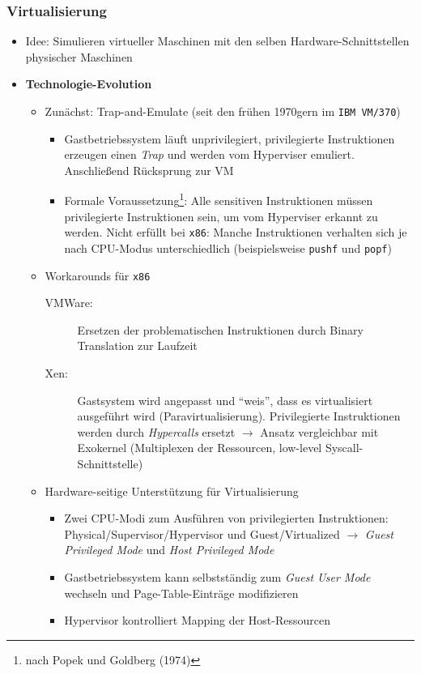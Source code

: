 \subsubsection{Virtualisierung}
\begin{itemize}
	\item Idee: Simulieren virtueller Maschinen mit den selben Hardware-Schnittstellen physischer Maschinen
	\item \textbf{Technologie-Evolution}
	\begin{itemize}
		\item Zunächst: Trap-and-Emulate (seit den frühen 1970gern im \texttt{IBM VM/370})
		\begin{itemize}
			\item Gastbetriebssystem läuft unprivilegiert, privilegierte Instruktionen erzeugen einen \textit{Trap} und werden vom Hyperviser emuliert. Anschließend Rücksprung zur VM
			\item Formale Voraussetzung\footnote{nach Popek und Goldberg (1974)}: Alle sensitiven Instruktionen müssen privilegierte Instruktionen sein, um vom Hyperviser erkannt zu werden. Nicht erfüllt bei \texttt{x86}: Manche Instruktionen verhalten sich je nach CPU-Modus unterschiedlich (beispielsweise \texttt{pushf} und \texttt{popf})
		\end{itemize}
		\item Workarounds für \texttt{x86}
		\begin{description}
			\item[VMWare:] Ersetzen der problematischen Instruktionen durch Binary Translation zur Laufzeit
			\item[Xen:] Gastsystem wird angepasst und "`weis"', dass es virtualisiert ausgeführt wird (Paravirtualisierung). Privilegierte Instruktionen werden durch \textit{Hypercalls} ersetzt \(\rightarrow\) Ansatz vergleichbar mit Exokernel (Multiplexen der Ressourcen, low-level Syscall-Schnittstelle)
		\end{description}
		\item Hardware-seitige Unterstützung für Virtualisierung
		\begin{itemize}
			\item Zwei CPU-Modi zum Ausführen von privilegierten Instruktionen: Physical/Supervisor/Hypervisor und Guest/Virtualized \(\rightarrow\) \textit{Guest Privileged Mode} und \textit{Host Privileged Mode}
			\item Gastbetriebssystem kann selbstständig zum \textit{Guest User Mode} wechseln und Page-Table-Einträge modifizieren
			\item Hypervisor kontrolliert Mapping der Host-Ressourcen
		\end{itemize}
	\end{itemize}
\end{itemize}



